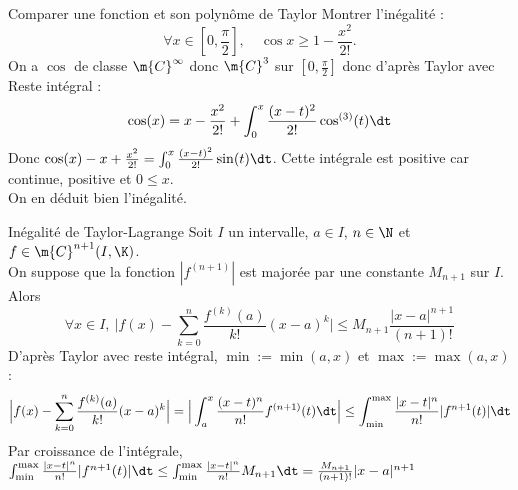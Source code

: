 \documentclass[11pt]{article}
\begin{document}
\begin{ex}{Comparer une fonction et son polynôme de Taylor}{}
    Montrer l'inégalité :
    \begin{equation*}
        \forall x \in \left[ 0,\frac{\pi}{2} \right], \quad \cos x \geq 1 - \frac{x^2}{2!}.
    \end{equation*}
    \tcblower
    On a $\cos$ de classe $\m{C}^{\infty}$ donc $\m{C}^3$ sur $[0, \frac{\pi}{2}]$ donc d'après Taylor avec Reste intégral :
    \begin{equation*}
        \cos(x) = x - \frac{x^2}{2!} + \int_0^x\frac{(x-t)^2}{2!}\cos^{(3)}(t)\dt
    \end{equation*}
    Donc $\cos(x) - x + \frac{x^2}{2!} = \int_0^x\frac{(x-t)^2}{2!}\sin(t)\dt$. Cette intégrale est positive car continue, positive et $0\leq x$.\\
    On en déduit bien l'inégalité.
\end{ex}

\begin{prop}{Inégalité de Taylor-Lagrange}{}
    Soit $I$ un intervalle, $a\in I$, $n\in \N$ et $f\in\m{C}^{n+1}(I,\K)$.\\
    On suppose que la fonction $|f^{(n+1)}|$ est majorée par une constante $M_{n+1}$ sur $I$. Alors
    \begin{equation*}
        \forall x \in I, ~ \Big|f(x)-\sum_{k=0}^n\frac{f^{(k)}(a)}{k!}(x-a)^k\Big|\leq M_{n+1}\frac{|x-a|^{n+1}}{(n+1)!}
    \end{equation*}
    \tcblower
    D'après Taylor avec reste intégral, $\min:=\min(a,x)$ et $\max:=\max(a,x)$ :
    \begin{equation*}
        \Big|f(x)-\sum_{k=0}^n\frac{f^{(k)}(a)}{k!}(x-a)^k\Big|=\Big|\int_a^x\frac{(x-t)^n}{n!}f^{(n+1)}(t)\dt\Big|\leq\int_{\min}^{\max}\frac{|x-t|^n}{n!}|f^{n+1}(t)|\dt
    \end{equation*}
    Par croissance de l'intégrale, $\int_{\min}^{\max}\frac{|x-t|^n}{n!}|f^{n+1}(t)|\dt\leq\int_{\min}^{\max}\frac{|x-t|^n}{n!}M_{n+1}\dt=\frac{M_{n+1}}{(n+1)!}|x-a|^{n+1}$
\end{prop}

\pagebreak
\end{document}
